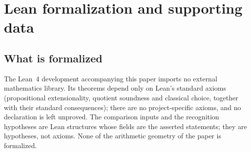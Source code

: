\section{Lean formalization and supporting data}\label{app:formalization}

\subsection*{What is formalized}

The Lean~4 development accompanying this paper imports no external
mathematics library.  Its theorems depend only on Lean's standard axioms
(propositional extensionality, quotient soundness and classical choice,
together with their standard consequences); there are no project-specific
axioms, and no declaration is left unproved.  The comparison inputs and
the recognition hypotheses are Lean structures whose fields are the
asserted statements; they are hypotheses, not axioms.  None of the
arithmetic geometry of the paper is formalized.

